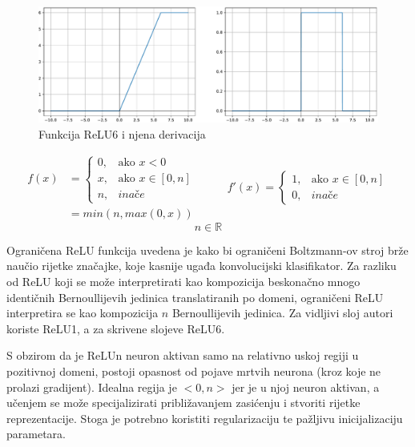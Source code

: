 \documentclass[times, utf8, numeric, diplomski]{fer}
\def\realnum{\mathbb{R}}
\def\otherwise{\textit{inače}}
\begin{document}
\begin{figure}[H]
\includegraphics[width=\textwidth]{ReLU6.pdf}
\centering
\caption{Funkcija ReLU6 i njena derivacija}
\label{fig:relu6}
\end{figure}

\begin{equation}
\label{eq:relun}
\begin{split}
f(x) &= \begin{cases}
0,		& \text{ako } x < 0 \\
x,		& \text{ako } x \in [0, n] \\
n,		& \otherwise
\end{cases} \\
&= min(n, max(0, x))
\end{split}
\qquad
\begin{split}
f'(x) = 
\begin{cases}
1,		& \text{ako } x \in [0, n] \\
0,		& \otherwise
\end{cases}
\end{split}
\end{equation}
\begin{equation*}
n \in \realnum
\end{equation*}

Ograničena ReLU funkcija uvedena je kako bi ograničeni Boltzmann-ov stroj  brže naučio rijetke značajke, koje kasnije ugađa konvolucijski klasifikator. Za razliku od ReLU koji se može interpretirati kao kompozicija beskonačno mnogo identičnih Bernoullijevih jedinica translatiranih po domeni, ograničeni ReLU interpretira se kao kompozicija $n$ Bernoullijevih jedinica. Za vidljivi sloj autori koriste ReLU1, a za skrivene slojeve ReLU6. \citep{relu6}

S obzirom da je ReLUn neuron aktivan samo na relativno uskoj regiji u pozitivnoj domeni, postoji opasnost od pojave mrtvih neurona (kroz koje ne prolazi gradijent). Idealna regija je $<0,n>$ jer  je u njoj neuron aktivan, a učenjem se može specijalizirati približavanjem zasićenju i stvoriti rijetke reprezentacije. Stoga je potrebno koristiti regularizaciju te pažljivu inicijalizaciju parametara.
\end{document}

